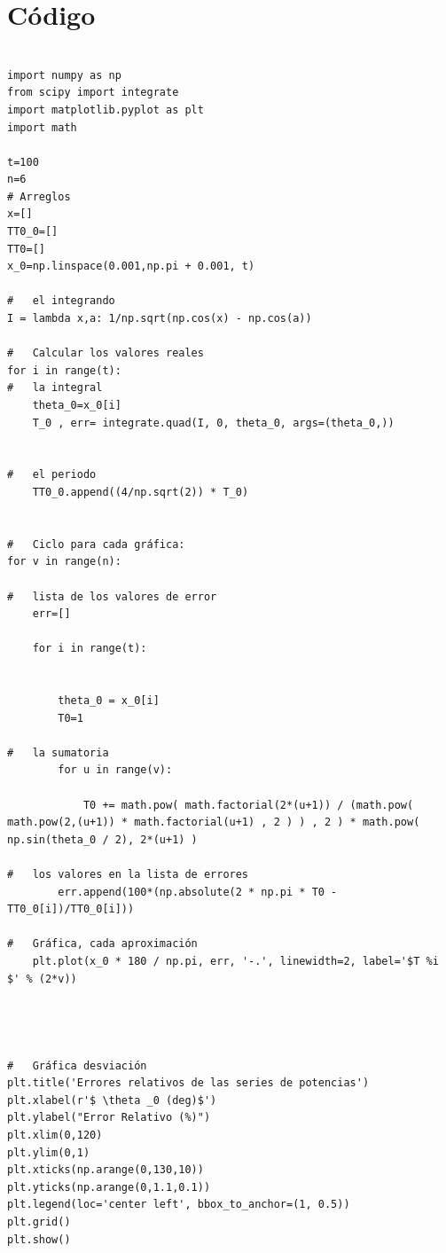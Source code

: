 \documentclass[11pt,spanish]{article}
\begin{document}
\section*{Código}

\begin{lstlisting}[caption=Código para calcular errores]

import numpy as np
from scipy import integrate
import matplotlib.pyplot as plt
import math

t=100
n=6
# Arreglos 
x=[]
TT0_0=[]
TT0=[]
x_0=np.linspace(0.001,np.pi + 0.001, t)

#   el integrando
I = lambda x,a: 1/np.sqrt(np.cos(x) - np.cos(a))

#   Calcular los valores reales
for i in range(t):
#   la integral
    theta_0=x_0[i]
    T_0 , err= integrate.quad(I, 0, theta_0, args=(theta_0,))
    
    
#   el periodo
    TT0_0.append((4/np.sqrt(2)) * T_0)

    
#   Ciclo para cada gráfica:    
for v in range(n):
    
#   lista de los valores de error    
    err=[]
        
    for i in range(t):
    
    
        theta_0 = x_0[i]
        T0=1

#   la sumatoria        
        for u in range(v):
            
            T0 += math.pow( math.factorial(2*(u+1)) / (math.pow( math.pow(2,(u+1)) * math.factorial(u+1) , 2 ) ) , 2 ) * math.pow( np.sin(theta_0 / 2), 2*(u+1) )   
            
#   los valores en la lista de errores           
        err.append(100*(np.absolute(2 * np.pi * T0 - TT0_0[i])/TT0_0[i]))
   
#   Gráfica, cada aproximación    
    plt.plot(x_0 * 180 / np.pi, err, '-.', linewidth=2, label='$T %i $' % (2*v))
    
    

   
#   Gráfica desviación
plt.title('Errores relativos de las series de potencias')
plt.xlabel(r'$ \theta _0 (deg)$')
plt.ylabel("Error Relativo (%)")
plt.xlim(0,120)
plt.ylim(0,1)
plt.xticks(np.arange(0,130,10))
plt.yticks(np.arange(0,1.1,0.1))
plt.legend(loc='center left', bbox_to_anchor=(1, 0.5))
plt.grid()
plt.show()

\end{lstlisting}
\end{document}
